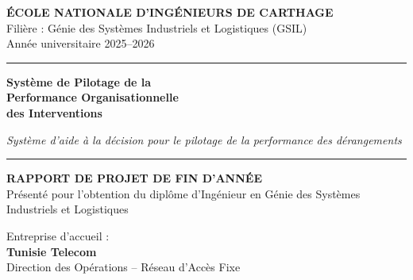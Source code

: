 \documentclass[10pt,a4paper]{report}
\begin{document}
\begin{titlepage}
\thispagestyle{empty}
\centering

\vspace*{0.5cm}

{\large\bfseries\color{ttblue}ÉCOLE NATIONALE D'INGÉNIEURS DE CARTHAGE}\\[0.15cm]
{\normalsize\color{ttgray}Filière : Génie des Systèmes Industriels et Logistiques (GSIL)}\\[0.1cm]
{\normalsize\color{ttgray}Année universitaire 2025--2026}

\vspace{0.8cm}
{\color{ttbluel}\rule{\linewidth}{2pt}}

\vspace{0.6cm}

{\LARGE\bfseries\color{ttblue}
Système de Pilotage de la\\[4pt]
Performance Organisationnelle\\[4pt]
des Interventions}

\vspace{0.3cm}
{\normalsize\color{ttgray}\textit{Système d'aide à la décision pour le pilotage de la performance des dérangements}}

\vspace{0.2cm}
{\color{ttbluel}\rule{\linewidth}{2pt}}

\vspace{0.5cm}

{\large\bfseries\color{ttgray}RAPPORT DE PROJET DE FIN D'ANNÉE}\\[0.2cm]
{\normalsize\color{ttgray}Présenté pour l'obtention du diplôme d'Ingénieur en Génie des Systèmes Industriels et Logistiques}

\vspace{0.6cm}

\begin{tcolorbox}[
  enhanced, colback=ttlblue!20, colframe=ttblue,
  width=0.85\linewidth, arc=6pt, boxsep=8pt
]
\centering
{\normalsize\color{ttgray}Entreprise d'accueil :}\\[4pt]
{\Large\bfseries\color{ttblue}Tunisie Telecom}\\[6pt]
{\normalsize\color{ttgray}Direction des Opérations -- Réseau d'Accès Fixe}
\end{tcolorbox}


\end{titlepage}
\end{document}
